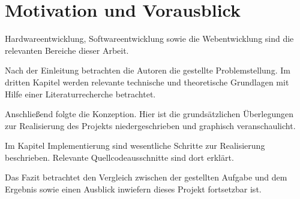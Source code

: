 \section{Motivation und Vorausblick}
Hardwareentwicklung, Softwareentwicklung sowie die Webentwicklung sind die relevanten Bereiche dieser Arbeit. 

Nach der Einleitung betrachten die Autoren die gestellte Problemstellung. 
Im dritten Kapitel werden relevante technische und theoretische Grundlagen mit Hilfe einer Literaturrecherche betrachtet. 

Anschließend folgte die Konzeption. Hier ist die grundsätzlichen Überlegungen zur Realisierung des Projekts niedergeschrieben und graphisch veranschaulicht. 

Im Kapitel Implementierung sind wesentliche Schritte zur Realisierung beschrieben. Relevante Quellcodeausschnitte sind dort erklärt.

Das Fazit betrachtet den Vergleich zwischen der gestellten Aufgabe und dem Ergebnis sowie einen Ausblick inwiefern dieses Projekt fortsetzbar ist.